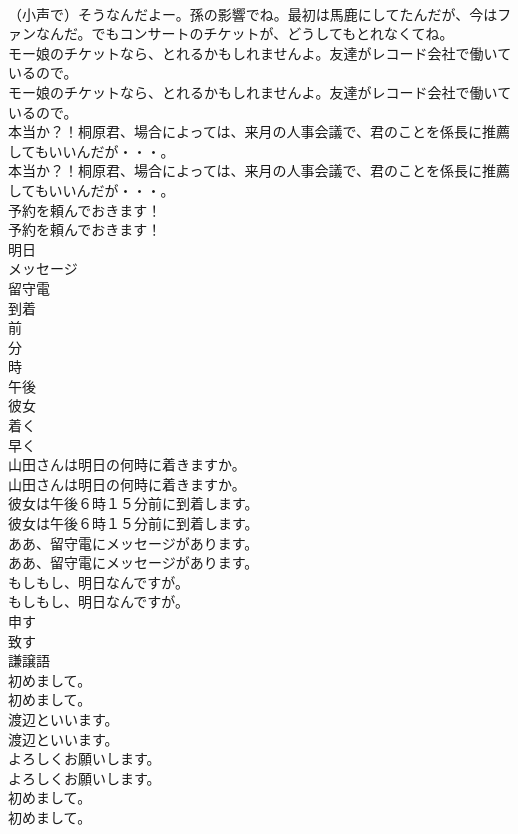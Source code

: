 \documentclass[8pt]{extreport}
\begin{document}
\begin{CJK}{UTF8}{min}
\\	（小声で）そうなんだよー。孫の影響でね。最初は馬鹿にしてたんだが、今はファンなんだ。でもコンサートのチケットが、どうしてもとれなくてね。 
\\	モー娘のチケットなら、とれるかもしれませんよ。友達がレコード会社で働いているので。	
\\	モー娘のチケットなら、とれるかもしれませんよ。友達がレコード会社で働いているので。 
\\	本当か？！桐原君、場合によっては、来月の人事会議で、君のことを係長に推薦してもいいんだが・・・。	
\\	本当か？！桐原君、場合によっては、来月の人事会議で、君のことを係長に推薦してもいいんだが・・・。 
\\	予約を頼んでおきます！	
\\	予約を頼んでおきます！ 
\\	明日
\\	メッセージ
\\	留守電
\\	到着
\\	前
\\	分
\\	時
\\	午後
\\	彼女
\\	着く
\\	早く
\\	山田さんは明日の何時に着きますか。	
\\	山田さんは明日の何時に着きますか。 
\\	彼女は午後６時１５分前に到着します。	
\\	彼女は午後６時１５分前に到着します。 
\\	ああ、留守電にメッセージがあります。	
\\	ああ、留守電にメッセージがあります。 
\\	もしもし、明日なんですが。	
\\	もしもし、明日なんですが。 
\\	申す
\\	致す
\\	謙譲語
\\	初めまして。	
\\	初めまして。 
\\	渡辺といいます。	
\\	渡辺といいます。 
\\	よろしくお願いします。	
\\	よろしくお願いします。 
\\	初めまして。	
\\	初めまして。 

\end{CJK}
\end{document}
